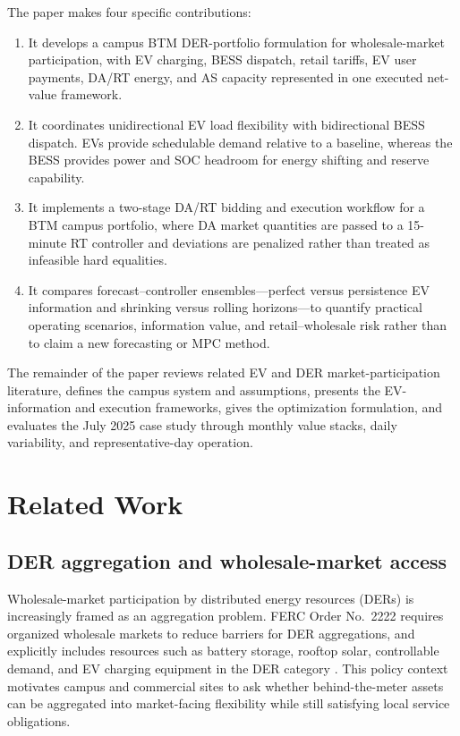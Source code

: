 \documentclass[final,5p,times]{elsarticle}
\begin{document}
The paper makes four specific contributions:
\begin{enumerate}[leftmargin=*]
    \item It develops a campus BTM DER-portfolio formulation for wholesale-market participation, with EV charging, BESS dispatch, retail tariffs, EV user payments, DA/RT energy, and AS capacity represented in one executed net-value framework.
    \item It coordinates unidirectional EV load flexibility with bidirectional BESS dispatch. EVs provide schedulable demand relative to a baseline, whereas the BESS provides power and SOC headroom for energy shifting and reserve capability.
    \item It implements a two-stage DA/RT bidding and execution workflow for a BTM campus portfolio, where DA market quantities are passed to a 15-minute RT controller and deviations are penalized rather than treated as infeasible hard equalities.
    \item It compares forecast--controller ensembles---perfect versus persistence EV information and shrinking versus rolling horizons---to quantify practical operating scenarios, information value, and retail--wholesale risk rather than to claim a new forecasting or MPC method.
\end{enumerate}

The remainder of the paper reviews related EV and DER market-participation literature, defines the campus system and assumptions, presents the EV-information and execution frameworks, gives the optimization formulation, and evaluates the July 2025 case study through monthly value stacks, daily variability, and representative-day operation.

\section{Related Work}
\label{sec:related_work}

\subsection{DER aggregation and wholesale-market access}
Wholesale-market participation by distributed energy resources (DERs) is increasingly framed as an aggregation problem. FERC Order No.~2222 requires organized wholesale markets to reduce barriers for DER aggregations, and explicitly includes resources such as battery storage, rooftop solar, controllable demand, and EV charging equipment in the DER category \cite{ferc2222}. This policy context motivates campus and commercial sites to ask whether behind-the-meter assets can be aggregated into market-facing flexibility while still satisfying local service obligations.
\end{document}

